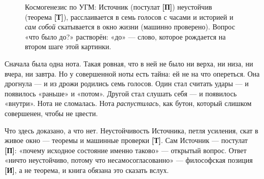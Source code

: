 \documentclass[11pt,letterpaper]{article}
\newcommand{\stT}{\textbf{[Т]}\xspace}
\newcommand{\stP}{\textbf{[П]}\xspace}
\newcommand{\stI}{\textbf{[И]}\xspace}
\newcommand{\voicerose}[4]{%
  \foreach \vang/\vcol in {90/cA,141.4/cS,192.8/cD,244.3/cL,295.7/cE,347.1/cO,38.6/cU}{%
    \draw[\vcol!55, thick] (#1,#2) -- ($(#1,#2)+(\vang:#3)$);
    \fill[\vcol] ($(#1,#2)+(\vang:#3)$) circle (#4);}}
\begin{document}
\begin{figure}[H]
\centering
{}
\caption{Космогенезис по УГМ: Источник (постулат \stP) неустойчив
(теорема \stT), расслаивается в семь голосов с часами и историей и
\emph{сам собой} скатывается в окно жизни (машинно проверено).
Вопрос «что было до?» растворён: «до» --- слово, которое рождается
на втором шаге этой картинки.}
\label{fig:source}
\end{figure}

\begin{skazbox}
Сначала была одна нота. Такая ровная, что в ней не было ни верха, ни
низа, ни вчера, ни завтра. Но у совершенной ноты есть тайна: ей не на
что опереться. Она дрогнула --- и из дрожи родились семь голосов. Один
стал считать удары --- и появилось «раньше» и «потом». Другой стал
слушать себя --- и появилось «внутри». Нота не сломалась. Нота
\emph{распустилась}, как бутон, который слишком совершенен, чтобы не
цвести.
\end{skazbox}

\begin{factbox}
Что здесь доказано, а что нет. Неустойчивость Источника, петля
усиления, скат в живое окно --- теоремы и машинные проверки \stT.
Сам Источник --- постулат \stP{}: «почему исходное состояние именно
таково» --- открытый вопрос. Ответ «ничто неустойчиво, потому что
несамосогласованно» --- философская позиция \stI, а не теорема, и
книга обязана это сказать вслух.
\end{factbox}
\end{document}

